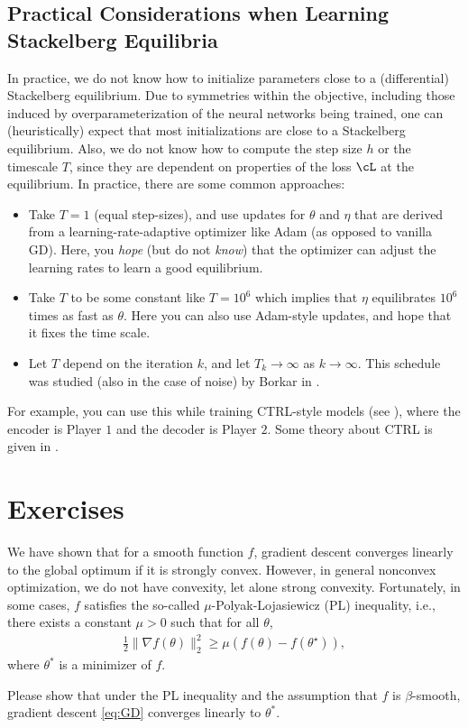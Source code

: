 \documentclass[../../book-main.tex]{subfiles}
\begin{document}
\subsection{Practical Considerations when Learning Stackelberg Equilibria}

In practice, we do not know how to initialize parameters close to a (differential) Stackelberg equilibrium. Due to symmetries within the objective, including those induced by overparameterization of the neural networks being trained, one can (heuristically) expect that most initializations are close to a Stackelberg equilibrium. Also, we do not know how to compute the step size \(h\) or the timescale \(T\), since they are dependent on properties of the loss \(\cL\) at the equilibrium. In practice, there are some common approaches:
\begin{itemize}
    \item Take \(T = 1\) (equal step-sizes), and use updates for \(\theta\) and \(\eta\) that are derived from a learning-rate-adaptive optimizer like Adam (as opposed to vanilla GD). Here, you \textit{hope} (but do not \textit{know}) that the optimizer can adjust the learning rates to learn a good equilibrium.
    \item Take \(T\) to be some constant like \(T = 10^{6}\) which implies that \(\eta\) equilibrates \(10^{6}\) times as fast as \(\theta\). Here you can also use Adam-style updates, and hope that it fixes the time scale.
    \item Let \(T\) depend on the iteration \(k\), and let \(T_{k} \to \infty\) as \(k \to \infty\). This schedule was studied (also in the case of noise) by Borkar in \cite{borkar1997stochastic}.
\end{itemize}
For example, you can use this while training CTRL-style models (see ), where the encoder is Player \(1\) and the decoder is Player \(2\). Some theory about CTRL is given in .

\section{Exercises}

\begin{exercise}
    We have shown that for a smooth function $f$, gradient descent converges linearly to the global optimum if it is strongly convex. However, in general nonconvex optimization, we do not have convexity, let alone strong convexity. Fortunately, in some cases, $f$ satisfies the so-called $\mu$-Polyak-Lojasiewicz (PL) inequality, i.e., there exists a constant $\mu > 0$ such that for all $\theta$, 
    \begin{align*}
        \frac{1}{2}\|\nabla f(\theta)\|_2^2 \ge \mu\left( f(\theta) - f(\theta^\star) \right),
    \end{align*}
    where $\theta^*$ is a minimizer of $f$. 
    
    Please show that under the PL inequality and the assumption that $f$ is $\beta$-smooth, gradient descent \eqref{eq:GD} converges linearly to  $\theta^*$. 
\end{exercise}
\end{document}
